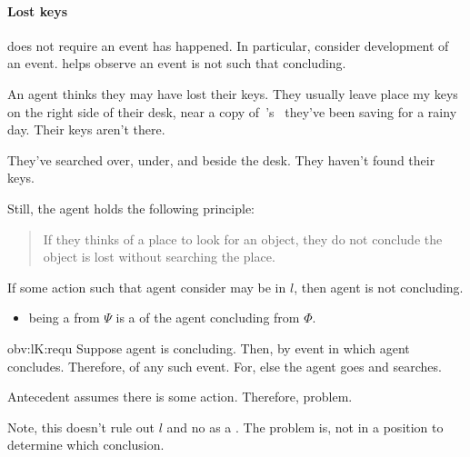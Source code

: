 \paragraph*{Lost keys}

\begin{note}
  \requ{} does not require an event has happened.
  In particular, consider development of an event.
  \requ{} helps observe an event is not such that concluding.

  \begin{scenario}%
    \label{illu:lost-key}%
    An agent thinks they may have lost their keys.
    They usually leave place my keys on the right side of their desk, near a copy of~\citeauthor{Vickers:1989tr}'s~ they've been saving for a rainy day.
    Their keys aren't there.

    They've searched over, under, and beside the desk.
    They haven't found their keys.

    Still, the agent holds the following principle:
    \begin{quote}
      If they thinks of a place to look for an object, they do not conclude the object is lost without searching the place.
    \end{quote}
  \end{scenario}

  \begin{observation}
    \label{obv:lK:requ}
    If some action such that agent consider may be in  \(l\), then agent is not concluding.
  \end{observation}

  {
    \color{red}
  \begin{itemize}
  \item
     being a \fc{} from \(\Psi\) is a \requ{} of the agent concluding  from \(\Phi\).
  \end{itemize}
  }

  \begin{motivation}{obv:lK:requ}
    Suppose agent is concluding.
    Then, by \assuPP{} event in which agent concludes.
    Therefore, \requ{} of any such event.
    For, else the agent goes and searches.

    Antecedent assumes there is some action.
    Therefore, problem.
  \end{motivation}

  Note, this doesn't rule out \(l\) and no as a \fc{}.
  The problem is, not in a position to determine which conclusion.
\end{note}

